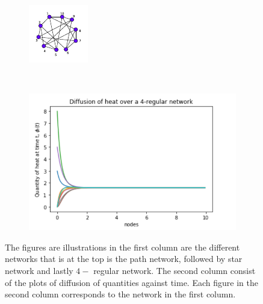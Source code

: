 \documentclass[10pt,a4paper]{article}
\begin{document}
\begin{figure}[!h]
\begin{subfigure}[b]{0.37\textwidth}
		\includegraphics[width=\textwidth]{images/regular-dif.pdf}
		\caption{}
		\label{regdifn-graph}
	\end{subfigure}~
	\begin{subfigure}[b]{0.45\textwidth}
		\includegraphics[width= \textwidth]{images/regular-quantity-time.png}
		\caption{}
		\label{regdifn-plot}
	\end{subfigure} 
   \caption{The figures are illustrations in the first column are the different networks that is at the top is the path network, followed by star network and lastly $4-$ regular network. The second column consist of the plots of diffusion of quantities against time. Each figure in the second column corresponds to the network in the first column.}
   \label{dif-diff-networks}
\end{figure}
\end{document}
